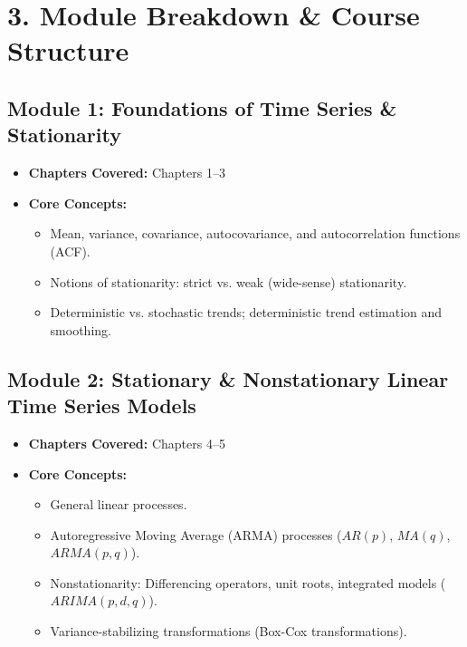 \documentclass{article}
\begin{document}
\section*{3. Module Breakdown \& Course Structure}

\subsection*{Module 1: Foundations of Time Series \& Stationarity}
\begin{itemize}
    \item \textbf{Chapters Covered:} Chapters 1--3
    \item \textbf{Core Concepts:}
    \begin{itemize}
        \item Mean, variance, covariance, autocovariance, and autocorrelation functions (ACF).
        \item Notions of stationarity: strict vs. weak (wide-sense) stationarity.
        \item Deterministic vs. stochastic trends; deterministic trend estimation and smoothing.
    \end{itemize}
\end{itemize}

\subsection*{Module 2: Stationary \& Nonstationary Linear Time Series Models}
\begin{itemize}
    \item \textbf{Chapters Covered:} Chapters 4--5
    \item \textbf{Core Concepts:}
    \begin{itemize}
        \item General linear processes.
        \item Autoregressive Moving Average (ARMA) processes ($AR(p)$, $MA(q)$, $ARMA(p,q)$).
        \item Nonstationarity: Differencing operators, unit roots, integrated models ($ARIMA(p,d,q)$).
        \item Variance-stabilizing transformations (Box-Cox transformations).
    \end{itemize}
\end{itemize}
\end{document}
